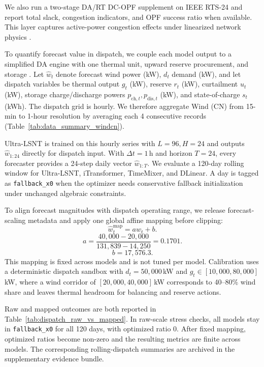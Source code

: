 \documentclass[review,1p,times]{elsarticle}
\begin{document}
We also run a two-stage DA/RT DC-OPF supplement on IEEE RTS-24 and report total slack, congestion indicators, and OPF success ratio when available. This layer captures active-power congestion effects under linearized network physics \cite{larrahondo2021acdcomp}.

To quantify forecast value in dispatch, we couple each model output to a simplified DA engine with one thermal unit, upward reserve procurement, and storage \cite{botterud2011operational,yan2025economicvalue}. Let $\hat{w}_t$ denote forecast wind power (kW), $d_t$ demand (kW), and let dispatch variables be thermal output $g_t$ (kW), reserve $r_t$ (kW), curtailment $u_t$ (kW), storage charge/discharge powers $p_{\text{ch},t},p_{\text{dis},t}$ (kW), and state-of-charge $s_t$ (kWh). The dispatch grid is hourly. We therefore aggregate Wind (CN) from 15-min to 1-hour resolution by averaging each 4 consecutive records (Table~\ref{tab:data_summary_windcn}).

Ultra-LSNT is trained on this hourly series with $L=96,H=24$ and outputs $\hat{w}_{1:24}$ directly for dispatch input. With $\Delta t=1$\,h and horizon $T=24$, every forecaster provides a 24-step daily vector $\hat{w}_{1:T}$. We evaluate a 120-day rolling window for Ultra-LSNT, iTransformer, TimeMixer, and DLinear. A day is tagged as \texttt{fallback\_x0} when the optimizer needs conservative fallback initialization under unchanged algebraic constraints.

To align forecast magnitudes with dispatch operating range, we release forecast-scaling metadata and apply one global affine mapping before clipping:
\begin{equation}
\hat{w}^{\text{map}}_t = a\hat{w}_t+b.
\end{equation}
\begin{equation}
a=\frac{40{,}000-20{,}000}{131{,}839-14{,}250}=0.1701.
\end{equation}
\begin{equation}
b=17{,}576.3.
\end{equation}
This mapping is fixed across models and is not tuned per model. Calibration uses a deterministic dispatch sandbox with $d_t=50{,}000$\,kW and $g_t\in[10{,}000,80{,}000]$\,kW, where a wind corridor of $[20{,}000,40{,}000]$\,kW corresponds to 40--80\% wind share and leaves thermal headroom for balancing and reserve actions.

Raw and mapped outcomes are both reported in Table~\ref{tab:dispatch_raw_vs_mapped}. In raw-scale stress checks, all models stay in \texttt{fallback\_x0} for all 120 days, with optimized ratio 0. After fixed mapping, optimized ratios become non-zero and the resulting metrics are finite across models. The corresponding rolling-dispatch summaries are archived in the supplementary evidence bundle.
\end{document}
